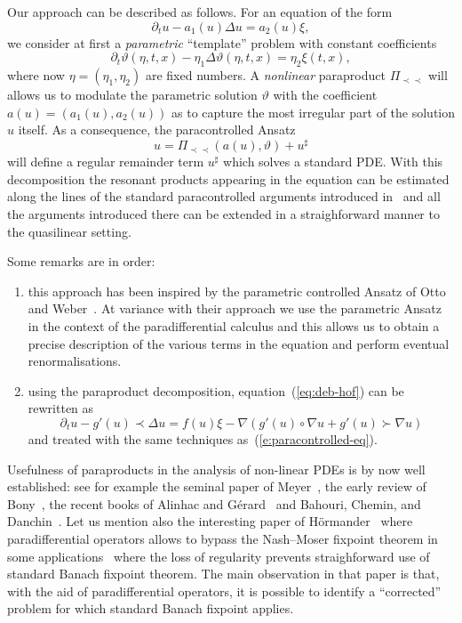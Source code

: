 \documentclass[11pt,reqno]{amsart}
\newcommand{\precprec}{\prec\!\!\!\prec}
\newcommand{\tmtextit}[1]{{\itshape{#1}}}
\newenvironment{enumeratealpha}{\begin{enumerate}[a{\textup{)}}] }{\end{enumerate}}
\begin{document}
Our approach can be described as follows. For an equation of the form
\[ \partial_t u - a_1 (u) \Delta u = a_2 (u) \xi, \]
we consider at first a \tmtextit{parametric} ``template'' problem with
constant coefficients
\begin{equation}
  \partial_t \vartheta (\eta, t, x) - \eta_1 \Delta \vartheta (\eta, t, x) =
  \eta_2 \xi (t, x), \label{eq:template}
\end{equation}
where now $\eta = (\eta_1, \eta_2)$ are fixed numbers. A \tmtextit{nonlinear}
paraproduct $\Pi_{\precprec}$ will allows us to modulate the parametric
solution $\vartheta$ with the coefficient $a (u) = (a_1 (u), a_2 (u))$ as to
capture the most irregular part of the solution $u$ itself. As a consequence,
the paracontrolled Ansatz
\[ u = \Pi_{\precprec} (a (u), \vartheta) + u^{\sharp} \]
will define a regular remainder term $u^{\sharp}$ which solves a standard PDE.
With this decomposition the resonant products appearing in the equation can be
estimated along the lines of the standard paracontrolled arguments introduced
in~{\cite{gubinelli_paracontrolled_2015}} and all the arguments introduced
there can be extended in a straighforward manner to the quasilinear setting.

Some remarks are in order:
\begin{enumeratealpha}
  \item this approach has been inspired by the parametric controlled Ansatz of
  Otto and Weber~{\cite{otto_quasilinear_2016}}. At variance with their
  approach we use the parametric Ansatz in the context of the paradifferential
  calculus and this allows us to obtain a precise description of the various
  terms in the equation and perform eventual renormalisations.
  
  \item using the paraproduct decomposition, equation~(\ref{eq:deb-hof}) can
  be rewritten as
  \[ \partial_t u - g' (u) \prec \Delta u = f (u) \xi - \nabla (g' (u) \circ
     \nabla u + g' (u) \succ \nabla u) \]
  and treated with the same techniques as~(\ref{e:paracontrolled-eq}).
\end{enumeratealpha}


Usefulness of paraproducts in the analysis of non-linear PDEs is by now well
established: see for example the seminal paper of
Meyer~{\cite{meyer_remarques_1981}}, the early review of
Bony~{\cite{bony_microlocal_1991}}, the recent books of Alinhac and
G{\'e}rard~{\cite{alinhac_operateurs_1991}} and Bahouri, Chemin, and
Danchin~{\cite{bahouri_fourier_2011}}. Let us mention also the interesting
paper of H{\"o}rmander~{\cite{hormander_nash_moser_1990}} where
paradifferential operators allows to bypass the Nash--Moser fixpoint theorem
in some applications \ where the loss of regularity prevents straighforward
use of standard Banach fixpoint theorem. The main observation in that paper is
that, with the aid of paradifferential operators, it is possible to identify a
``corrected'' problem for which standard Banach fixpoint applies.
\end{document}
